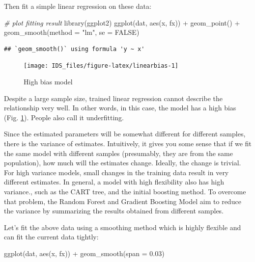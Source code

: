 \documentclass[
  12pt,
]{krantz}
\makeatletter
\newenvironment{Shaded}{\begin{snugshade}}{\end{snugshade}}
\newcommand{\AttributeTok}[1]{\textcolor[rgb]{0.61,0.61,0.61}{#1}}
\newcommand{\CommentTok}[1]{\textcolor[rgb]{0.37,0.37,0.37}{\textit{#1}}}
\newcommand{\ConstantTok}[1]{\textcolor[rgb]{0,0,0}{#1}}
\newcommand{\FloatTok}[1]{\textcolor[rgb]{0.06,0.06,0.06}{#1}}
\newcommand{\FunctionTok}[1]{\textcolor[rgb]{0,0,0}{#1}}
\newcommand{\NormalTok}[1]{#1}
\newcommand{\SpecialCharTok}[1]{\textcolor[rgb]{0,0,0}{#1}}
\newcommand{\StringTok}[1]{\textcolor[rgb]{0.5,0.5,0.5}{#1}}
\newenvironment{kframe}{%
\medskip{}
\setlength{\fboxsep}{.8em}
 \def\at@end@of@kframe{}%
 \ifinner\ifhmode%
  \def\at@end@of@kframe{\end{minipage}}%
  \begin{minipage}{\columnwidth}%
 \fi\fi%
 \def\FrameCommand##1{\hskip\@totalleftmargin \hskip-\fboxsep
 \colorbox{shadecolor}{##1}\hskip-\fboxsep
     \hskip-\linewidth \hskip-\@totalleftmargin \hskip\columnwidth}%
 \MakeFramed {\advance\hsize-\width
   \@totalleftmargin\z@ \linewidth\hsize
   \@setminipage}}%
 {\par\unskip\endMakeFramed%
 \at@end@of@kframe}
\renewenvironment{Shaded}{\begin{kframe}}{\end{kframe}}
\makeatother
\begin{document}
Then fit a simple linear regression on these data:

\begin{Shaded}
\begin{Highlighting}[]
\CommentTok{\# plot fitting result}
\FunctionTok{library}\NormalTok{(ggplot2)}
\FunctionTok{ggplot}\NormalTok{(dat, }\FunctionTok{aes}\NormalTok{(x, fx)) }\SpecialCharTok{+} 
    \FunctionTok{geom\_point}\NormalTok{() }\SpecialCharTok{+} 
    \FunctionTok{geom\_smooth}\NormalTok{(}\AttributeTok{method =} \StringTok{"lm"}\NormalTok{, }\AttributeTok{se =} \ConstantTok{FALSE}\NormalTok{)}
\end{Highlighting}
\end{Shaded}

\begin{verbatim}
## `geom_smooth()` using formula 'y ~ x'
\end{verbatim}

\begin{figure}

{\centering \texttt{[image: IDS\_files/figure-latex/linearbias-1]} 

}

\caption{High bias model}\label{fig:linearbias}
\end{figure}

Despite a large sample size, trained linear regression cannot describe the relationship very well. In other words, in this case, the model has a high bias (Fig. \ref{fig:linearbias}). People also call it underfitting.

Since the estimated parameters will be somewhat different for different samples, there is the variance of estimates. Intuitively, it gives you some sense that if we fit the same model with different samples (presumably, they are from the same population), how much will the estimates change. Ideally, the change is trivial. For high variance models, small changes in the training data result in very different estimates. In general, a model with high flexibility also has high variance., such as the CART tree, and the initial boosting method. To overcome that problem, the Random Forest and Gradient Boosting Model aim to reduce the variance by summarizing the results obtained from different samples.

Let's fit the above data using a smoothing method which is highly flexible and can fit the current data tightly:

\begin{Shaded}
\begin{Highlighting}[]
\FunctionTok{ggplot}\NormalTok{(dat, }\FunctionTok{aes}\NormalTok{(x, fx)) }\SpecialCharTok{+} \FunctionTok{geom\_smooth}\NormalTok{(}\AttributeTok{span =} \FloatTok{0.03}\NormalTok{)}
\end{Highlighting}
\end{Shaded}
\end{document}
